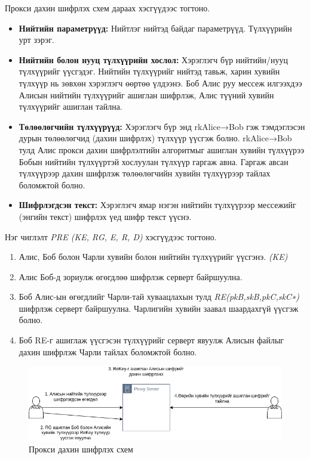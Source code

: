 Прокси дахин шифрлэх схем дараах хэсгүүдээс тогтоно.
\begin{itemize}
    \item \textbf{Нийтийн параметрүүд:} Нийтлэг нийтэд байдаг параметрүүд. Түлхүүрийн урт зэрэг.

    \item \textbf{Нийтийн болон нууц түлхүүрийн хослол:} Хэрэглэгч бүр нийтийн/нууц түлхүүрийг үүсгэдэг. Нийтийн түлхүүрийг нийтэд тавьж, харин хувийн түлхүүр нь зөвхөн хэрэглэгч өөртөө үлдээнэ. Боб Алис руу мессеж илгээхдээ Алисын нийтийн түлхүүрийг ашиглан шифрлэж, Алис түүний хувийн түлхүүрийг ашиглан тайлна.

    \item \textbf{Төлөөлөгчийн түлхүүрүүд:} Хэрэглэгч бүр энд rkAlice→Bob гэж тэмдэглэсэн дурын төлөөлөгчид (дахин шифрлэх) түлхүүр үүсгэж болно. rkAlice→Bob тулд Алис прокси дахин шифрлэлтийн алгоритмыг ашиглан хувийн түлхүүрээ Бобын нийтийн түлхүүртэй хослуулан түлхүүр гаргаж авна. Гаргаж авсан түлхүүрээр дахин шифрлэж төлөөлөгчийн хувийн түлхүүрээр тайлах боломжтой болно.

    \item \textbf{Шифрлэгдсэн текст:} Хэрэглэгч ямар нэгэн нийтийн түлхүүрээр мессежийг (энгийн текст) шифрлэх үед шифр текст үүснэ.
\end{itemize}

Нэг чиглэлт \emph{PRE (KE, RG, E, R, D)} хэсгүүдээс тогтоно.
\begin{enumerate}
    \item Алис, Боб болон Чарли хувийн болон нийтийн түлхүүрийг үүсгэнэ. \emph{(KE)}
    \item Алис Боб-д зориулж өгөгдлөө шифрлэж серверт байршуулна.
    \item Боб Алис-ын өгөгдлийг Чарли-тай хуваацлахын тулд \emph{RE(pkB,skB,pkC,skC∗)} шифрлэж серверт байршуулна. Чарлигийн хувийн заавал шаардахгүй үүсгэж болно.
    \item Боб RE-г ашиглаж үүсгэсэн түлхүүрийг серверт явуулж Алисын файлыг дахин шифрлэж Чарли тайлах боломжтой болно.
\end{enumerate}

\begin{figure}[ht]
    \centering
    \includegraphics[scale=0.5]{Figures/encryption_schemes/PRE.drawio.png}
    \caption{Прокси дахин шифрлэх схем}
    \label{fig:PRE_Scheme}
\end{figure}

